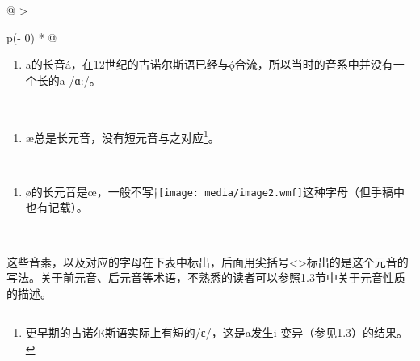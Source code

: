 \begin{longtable}[]{@{}
  >{\raggedright\arraybackslash}p{(\columnwidth - 0\tabcolsep) * }@{}}
  \toprule\noalign{}
  \begin{minipage}[b]{\linewidth}\raggedright
    \begin{enumerate}
      \def\labelenumi{\arabic{enumi}.}
      \item
            a的长音á，在12世纪的古诺尔斯语已经与ǫ́合流，所以当时的音系中并没有一个长的a
            /ɑ:/。
    \end{enumerate}
  \end{minipage} \\
  \midrule\noalign{}
  \endhead
  \bottomrule\noalign{}
  \endlastfoot
  \begin{minipage}[t]{\linewidth}\raggedright
    \begin{enumerate}
      \def\labelenumi{\arabic{enumi}.}
      \setcounter{enumi}{1}
      \item
            æ总是长元音，没有短元音与之对应\footnote{更早期的古诺尔斯语实际上有短的/ɛ/，这是a发生i-变异（参见1.3）的结果。}。
    \end{enumerate}
  \end{minipage} \\
  \begin{minipage}[t]{\linewidth}\raggedright
    \begin{enumerate}
      \def\labelenumi{\arabic{enumi}.}
      \setcounter{enumi}{2}
      \item
            ø的长元音是œ，一般不写†\texttt{[image: media/image2.wmf]}这种字母（但手稿中也有记载）。
    \end{enumerate}
  \end{minipage} \\
\end{longtable}

这些音素，以及对应的字母在下表中标出，后面用尖括号\textless\textgreater 标出的是这个元音的写法。关于前元音、后元音等术语，不熟悉的读者可以参照\hyperref[ux53d8ux5143ux97f3]{1.3}节中关于元音性质的描述。

